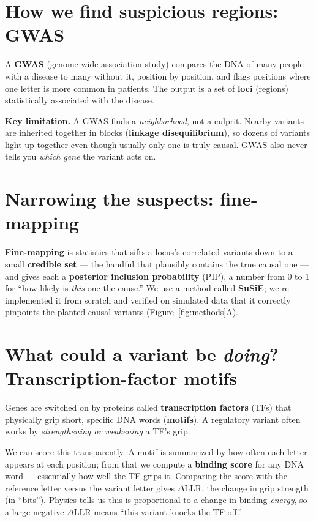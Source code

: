 \documentclass[11pt]{article}
\newcommand{\term}[1]{\textbf{\color{navy}#1}}
\begin{document}
\section{How we find suspicious regions: GWAS}
A \term{GWAS} (genome-wide association study) compares the DNA of many people with a disease to many
without it, position by position, and flags positions where one letter is more common in patients. The
output is a set of \term{loci} (regions) statistically associated with the disease.

\begin{key}
\textbf{Key limitation.} A GWAS finds a \emph{neighborhood}, not a culprit. Nearby variants are inherited
together in blocks (\term{linkage disequilibrium}), so dozens of variants light up together even though
usually only one is truly causal. GWAS also never tells you \emph{which gene} the variant acts on.
\end{key}

\section{Narrowing the suspects: fine-mapping}
\term{Fine-mapping} is statistics that sifts a locus's correlated variants down to a small
\term{credible set} --- the handful that plausibly contains the true causal one --- and gives each a
\term{posterior inclusion probability} (PIP), a number from 0 to 1 for ``how likely is \emph{this} one the
cause.'' We use a method called \term{SuSiE}; we re-implemented it from scratch and verified on simulated
data that it correctly pinpoints the planted causal variants (Figure~\ref{fig:methods}A).

\section{What could a variant be \emph{doing}? Transcription-factor motifs}
Genes are switched on by proteins called \term{transcription factors} (TFs) that physically grip short,
specific DNA words (\term{motifs}). A regulatory variant often works by \emph{strengthening or weakening}
a TF's grip.

We can score this transparently. A motif is summarized by how often each letter appears at each position;
from that we compute a \term{binding score} for any DNA word --- essentially how well the TF grips it.
Comparing the score with the reference letter versus the variant letter gives \(\Delta\)LLR, the change in
grip strength (in ``bits''). Physics tells us this is proportional to a change in binding \emph{energy}, so
a large negative \(\Delta\)LLR means ``this variant knocks the TF off.''
\end{document}
